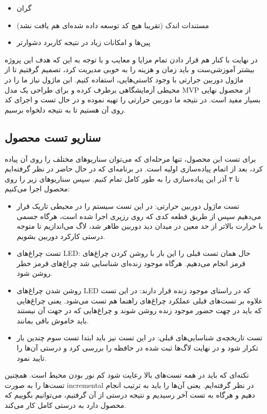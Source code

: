 \documentclass[12pt]{article}
\begin{document}
\begin{itemize}
    \item گران
    \item مستندات اندک (تقریبا هیچ کد توسعه داده شده‌ای هم یافت نشد)
    \item پین‌ها و امکانات زیاد در نتیجه کاربرد دشوارتر
\end{itemize}

در نهایت با کنار هم قرار دادن تمام مزایا و معایب و با توجه به این که هدف این پروژه بیشتر آموزشی‌ست و باید زمان و هزینه را به خوبی مدیریت کرد، تصمیم گرفتیم تا از ماژول دوربین حرارتی با وجود کاستی‌هایی، استفاده کنیم. این ماژول نیاز ما را در محیطی آزمایشگاهی برطرف کرده و برای طراحی یک مدل MVP از محصول نهایی بسیار مفید است. 
در نتیجه ما دوربین حرارتی را تهیه نموده و در حال تست و اجرای کد روی آن هستیم تا به نتیجه دلخواه برسیم.

\subsection{سناریو تست محصول}
برای تست این محصول، تنها مرحله‌ای که می‌توان سناریو‌های مختلف را روی آن پیاده کرد، بعد از اتمام پیاده‌سازی اولیه است. در برنامه‌ای که در حال حاضر در نظر گرفته‌ایم تا ۲ آذر این پیاده‌سازی را به طور کامل تمام کنیم. سپس سناریو‌های زیر را روی محصول اجرا می‌کنیم:

\begin{itemize}
    \item تست ماژول دوربین حرارتی: در این تست سیستم را در محیطی تاریک قرار می‌دهیم سپس از طریق قطعه کدی که روی رزپری اجرا شده است، هرگاه جسمی با حرارت بالاتر از حد معین در میدان دید دوربین ظاهر شد، لاگ می‌اندازیم تا متوجه درستی کارکرد دوربین بشویم.
    
    \item تست چراغ‌های LED: حال همان تست قبلی را این بار با روشن کردن چراغ‌های قرمز انجام می‌دهیم. هرگاه موجود زنده‌ای شناسایی شد چرا‌غ‌های قرمز خطر روشن شود.
    
    \item روشن شدن چراغ‌های LED که در راستای موجود زنده قرار دارند: در این تست علاوه بر تست‌های قبلی عملکرد چراغ‌های راهنما هم تست می‌شود. یعنی چراغ‌هایی که باید در چهت حضور موجود زنده روشن شوند و چراغ‌هایی که در جهت آن نیستند باید خاموش باقی بمانند.
    
    \item تست تاریخچه‌ی شناسایی‌های قبلی: در این تست نیز باید ابتدا تست سوم چندین بار تکرار شود و در نهایت لاگ‌ها ثبت شده در حافظه را بررسی کرد و درستی آن‌ها را تایید نمود.
\end{itemize}

نکته‌ای که باید در همه تست‌های بالا رعایت شود کم نور بودن محیط است. همچنین تست‌ها را به صورت incremental در نظر گرفته‌ایم. یعنی آن‌ها را باید به ترتیب انجام دهیم و هرگاه به تست آخر رسیدیم و نتیجه درستی از آن گرفتیم، می‌توانیم بگوییم که محصول دارد به درستی کامل کار می‌کند.
\end{document}
